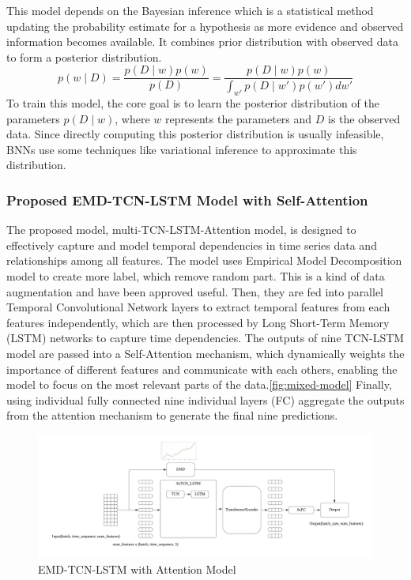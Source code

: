 \documentclass[final-report]{report-template}
\begin{document}
This model depends on the Bayesian inference which is a statistical method updating the probability estimate for a hypothesis as more evidence and observed information becomes available. It combines prior distribution with observed data to form a posterior distribution. 
\begin{equation}
p(w \mid D) = \frac{p(D \mid w) p(w)}{p(D)} = \frac{p(D \mid w) p(w)}{\int_{w'} p(D \mid w') p(w') dw'}
\end{equation}
To train this model, the core goal is to learn the posterior distribution of the parameters \(p(D \mid w)\), where \(w\) represents the parameters and \(D\) is the observed data. Since directly computing this posterior distribution is usually infeasible, BNNs use some techniques like variational inference to approximate this distribution.\cite{item_79a95918d094486381eddd0e003bcd84}

\subsubsection{\textbf{Proposed EMD-TCN-LSTM Model with Self-Attention}}
The proposed model, multi-TCN-LSTM-Attention model, is designed to effectively capture and model temporal dependencies in time series data and relationships among all features. The model uses Empirical Model Decomposition model to create more label, which remove random part. This is a kind of data augmentation and have been approved useful. Then, they are fed into parallel Temporal Convolutional Network layers to extract temporal features from each features independently, which are then processed by Long Short-Term Memory (LSTM) networks to capture time dependencies. The outputs of nine TCN-LSTM model are passed into a Self-Attention mechanism, which dynamically weights the importance of different features and communicate with each others, enabling the model to focus on the most relevant parts of the data.\autoref{fig:mixed-model} Finally, using individual fully connected  nine individual layers (FC) aggregate the outputs from the attention mechanism to generate the final nine predictions. 
\begin{figure}[h]
    \centering
    \includegraphics[width=1\linewidth]{figures/mixed_model.png}
    \caption{EMD-TCN-LSTM with Attention Model}
    \label{fig:mixed-model}
\end{figure}
\end{document}
